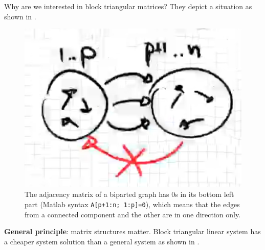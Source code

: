 \documentclass[computationalMathematics.tex]{subfiles}
\begin{document}
Why are we interested in block triangular matrices? They depict a situation as shown in .
\begin{figure}[H]
    \centering
    \includegraphics[scale=1]{pics/20sett/1.png}
    \caption{The adjacency matrix of a biparted graph has $0$s in its bottom left part (Matlab syntax \texttt{A[p+1:n; 1:p]=0}), which means that the edges from a connected component and the other are in one direction only.}\label{fig:20sett3}
\end{figure}

\textbf{General principle}: matrix structures matter. Block triangular linear system has a cheaper system solution than a general system as shown in .
\end{document}
